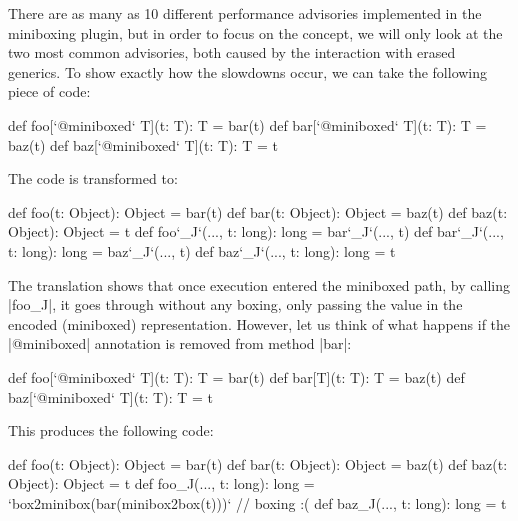 
There are as many as 10 different performance advisories implemented in the miniboxing plugin, but in order to focus on the concept, we will only look at the two most common advisories, both caused by the interaction with erased generics. To show exactly how the slowdowns occur, we can take the following piece of code:

\begin{lstlisting-nobreak}
 def foo[`@miniboxed` T](t: T): T = bar(t)
 def bar[`@miniboxed` T](t: T): T = baz(t)
 def baz[`@miniboxed` T](t: T): T = t
\end{lstlisting-nobreak}

The code is transformed to:

\begin{lstlisting-nobreak}
 def foo(t: Object): Object = bar(t)
 def bar(t: Object): Object = baz(t)
 def baz(t: Object): Object = t
 def foo`_J`(..., t: long): long = bar`_J`(..., t)
 def bar`_J`(..., t: long): long = baz`_J`(..., t)
 def baz`_J`(..., t: long): long = t
\end{lstlisting-nobreak}

The translation shows that once execution entered the miniboxed path, by calling |foo_J|, it goes through without any boxing, only passing the value in the encoded (miniboxed) representation. However, let us think of what happens if the |@miniboxed| annotation is removed from method |bar|:

\begin{lstlisting-nobreak}
 def foo[`@miniboxed` T](t: T): T = bar(t)
 def bar[T](t: T): T = baz(t)
 def baz[`@miniboxed` T](t: T): T = t
\end{lstlisting-nobreak}

This produces the following code:

\begin{lstlisting-nobreak}
 def foo(t: Object): Object = bar(t)
 def bar(t: Object): Object = baz(t)
 def baz(t: Object): Object = t
 def foo_J(..., t: long): long = `box2minibox(bar(minibox2box(t)))` // boxing :(
 def baz_J(..., t: long): long = t
\end{lstlisting-nobreak}

